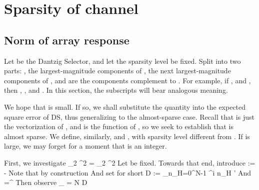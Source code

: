 \section {Sparsity of channel}

\subsection {Norm of array response}

Let  be the Dantzig Selector, and let the sparsity level  be fixed.
Split  into two parts: , the largest-magnitude  components of ,  the next  largest-magnitude components of , and  are the components complement to .
For example, if , and , then , , and .
In this section, the subscripts  will bear analogous meaning.

We hope that  is small.
If so, we shall substitute the quantity into the expected square error of DS, thus generalizing to the almost-sparse case.
Recall that  is just the vectorization of , and is the function of , so we seek to establish that  is almost sparse.
We define, similarly,  and , with sparsity level  different from .
If  is large, we may forget for a moment that  is an integer.

First, we investigate
%
 {
 _2 ^2
= _2 ^2 
}
%
Let \m {\f} be fixed.
Towards that end, introduce
%
 {
\psi {}
:= \;
\; \RB {2\pi}
- \pi 
}
%
Note that by construction
%
 {
\leq \pi 
}
%
And set for short
%
 {
D 
:= \sum_{n_H=0}^{N-1} ^{i n_H \psi'} 
}
%
And
%
 {
 \SB {\f}
=^\dagger {} \SB {\f} 
}
%
Then observe
%
 {
 \SB {\f} _{}
= {N} D  
}

